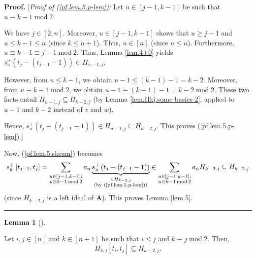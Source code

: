 \documentclass[numbers=enddot,12pt,final,onecolumn,notitlepage]{scrartcl}%
\theoremstyle{definition}
\newtheorem{lem}[theo]{Lemma}
\newenvironment{lemma}[1][]
{\begin{lem}[#1]\begin{leftbar}}
{\end{leftbar}\end{lem}}
\newenvironment{proof}[1][Proof]{\noindent\textbf{#1.} }{\ \rule{0.5em}{0.5em}}
\let\sumnonlimits\sum
\renewcommand{\sum}{\sumnonlimits\limits}
\begin{document}
\begin{proof}
[\textit{Proof of (\ref{pf.lem.5.p-lem}):} Let $u\in\left[  j-1,k-1\right]  $
be such that $u\equiv k-1\operatorname{mod}2$.

We have $j\in\left[  2,n\right]  $. Moreover, $u\in\left[  j-1,k-1\right]  $
shows that $u\geq j-1$ and $u\leq k-1\leq n$ (since $k\leq n+1$). Thus,
$u\in\left[  n\right]  $ (since $u\leq n$). Furthermore, $u\equiv k-1\equiv
j-1\operatorname{mod}2$. Thus, Lemma \ref{lem.4+0} yields $s_{u}^{+}\left(
t_{j}-\left(  t_{j-1}-1\right)  \right)  \in H_{u-1,j}$.

However, from $u\leq k-1$, we obtain $u-1\leq\left(  k-1\right)  -1=k-2$.
Moreover, from $u\equiv k-1\operatorname{mod}2$, we obtain $u-1\equiv\left(
k-1\right)  -1=k-2\operatorname{mod}2$. These two facts entail $H_{u-1,j}%
\subseteq H_{k-2,j}$ (by Lemma \ref{lem.Hkj.some-basics-2}, applied to $u-1$
and $k-2$ instead of $v$ and $w$).

Hence, $s_{u}^{+}\left(  t_{j}-\left(  t_{j-1}-1\right)  \right)  \in
H_{u-1,j}\subseteq H_{k-2,j}$. This proves (\ref{pf.lem.5.p-lem}).] \medskip

Now, (\ref{pf.lem.5.sksum}) becomes%
\[
s_{k}^{+}\left[  t_{j-1},t_{j}\right]  =\sum_{\substack{u\in\left[
j-1,k-1\right]  ;\\u\equiv k-1\operatorname{mod}2}}a_{u}\underbrace{s_{u}%
^{+}\left(  t_{j}-\left(  t_{j-1}-1\right)  \right)  }_{\substack{\in
H_{k-2,j}\\\text{(by (\ref{pf.lem.5.p-lem}))}}}\in\sum_{\substack{u\in\left[
j-1,k-1\right]  ;\\u\equiv k-1\operatorname{mod}2}}a_{u}H_{k-2,j}\subseteq
H_{k-2,j}%
\]
(since $H_{k-2,j}$ is a left ideal of $\mathbf{A}$). This proves Lemma
\ref{lem.5}.
\end{proof}

\begin{lemma}
\label{lem.6}Let $i,j\in\left[  n\right]  $ and $k\in\left[  n+1\right]  $ be
such that $i\leq j$ and $k\equiv j\operatorname{mod}2$. Then,%
\[
H_{k,j}\left[  t_{i},t_{j}\right]  \subseteq H_{k-2,j}.
\]

\end{lemma}
\end{document}
